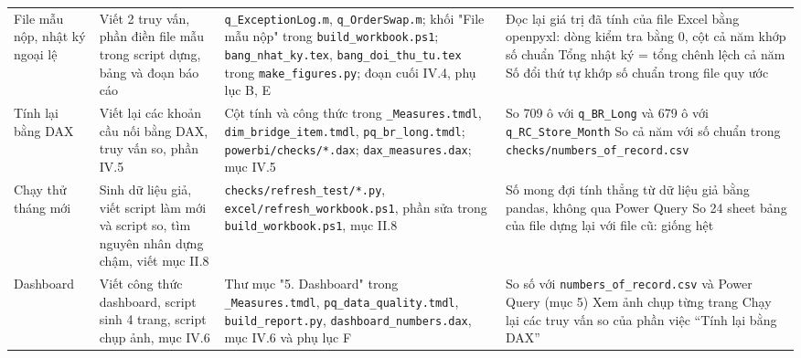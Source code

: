 {\begin{longtable}{@{}L{2.1cm} L{3.6cm} L{4.2cm} L{5.2cm}@{}}
File mẫu nộp, nhật ký ngoại lệ & Viết 2 truy vấn, phần điền file mẫu trong script dựng, bảng và đoạn báo cáo & \texttt{q\_\allowbreak{}ExceptionLog.\allowbreak{}m}, \texttt{q\_\allowbreak{}OrderSwap.\allowbreak{}m}; khối "File mẫu nộp" trong \texttt{build\_\allowbreak{}workbook.\allowbreak{}ps1}; \texttt{bang\_\allowbreak{}nhat\_\allowbreak{}ky.\allowbreak{}tex}, \texttt{bang\_\allowbreak{}doi\_\allowbreak{}thu\_\allowbreak{}tu.\allowbreak{}tex} trong \texttt{make\_\allowbreak{}figures.\allowbreak{}py}; đoạn cuối IV.4, phụ lục B, E & \textbullet{} Đọc lại giá trị đã tính của file Excel bằng openpyxl: dòng kiểm tra bằng 0, cột cả năm khớp số chuẩn \newline \textbullet{} Tổng nhật ký = tổng chênh lệch cả năm \newline \textbullet{} Số đổi thứ tự khớp số chuẩn trong file quy ước \\
Tính lại bằng DAX & Viết lại các khoản cầu nối bằng DAX, truy vấn so, phần IV.5 & Cột tính và công thức trong \texttt{\_\allowbreak{}Measures.\allowbreak{}tmdl}, \texttt{dim\_\allowbreak{}bridge\_\allowbreak{}item.\allowbreak{}tmdl}, \texttt{pq\_\allowbreak{}br\_\allowbreak{}long.\allowbreak{}tmdl}; \texttt{powerbi/\allowbreak{}checks/\allowbreak{}*.\allowbreak{}dax}; \texttt{dax\_\allowbreak{}measures.\allowbreak{}dax}; mục IV.5 & \textbullet{} So 709 ô với \texttt{q\_\allowbreak{}BR\_\allowbreak{}Long} và 679 ô với \texttt{q\_\allowbreak{}RC\_\allowbreak{}Store\_\allowbreak{}Month} \newline \textbullet{} So cả năm với số chuẩn trong \texttt{checks/\allowbreak{}numbers\_\allowbreak{}of\_\allowbreak{}record.\allowbreak{}csv} \\
Chạy thử tháng mới & Sinh dữ liệu giả, viết script làm mới và script so, tìm nguyên nhân dựng chậm, viết mục II.8 & \texttt{checks/\allowbreak{}refresh\_\allowbreak{}test/\allowbreak{}*.\allowbreak{}py}, \texttt{excel/\allowbreak{}refresh\_\allowbreak{}workbook.\allowbreak{}ps1}, phần sửa trong \texttt{build\_\allowbreak{}workbook.\allowbreak{}ps1}, mục II.8 & \textbullet{} Số mong đợi tính thẳng từ dữ liệu giả bằng pandas, không qua Power Query \newline \textbullet{} So 24 sheet bảng của file dựng lại với file cũ: giống hệt \\
Dashboard & Viết công thức dashboard, script sinh 4 trang, script chụp ảnh, mục IV.6 & Thư mục "5. Dashboard" trong \texttt{\_\allowbreak{}Measures.\allowbreak{}tmdl}, \texttt{pq\_\allowbreak{}data\_\allowbreak{}quality.\allowbreak{}tmdl}, \texttt{build\_\allowbreak{}report.\allowbreak{}py}, \texttt{dashboard\_\allowbreak{}numbers.\allowbreak{}dax}, mục IV.6 và phụ lục F & \textbullet{} So số với \texttt{numbers\_\allowbreak{}of\_\allowbreak{}record.\allowbreak{}csv} và Power Query (mục 5) \newline \textbullet{} Xem ảnh chụp từng trang \newline \textbullet{} Chạy lại các truy vấn so của phần việc “Tính lại bằng DAX” \\

\end{longtable}}
